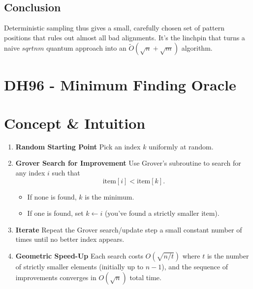 \documentclass[11pt]{article}
\begin{document}
\subsection*{Conclusion}
Deterministic sampling thus gives a small, carefully chosen set of pattern positions that rules out almost all bad alignments. It's the linchpin that turns a naive \(sqrt{nm}\) quantum approach into an \(\widetilde{O}(\sqrt{n} + \sqrt{m})\) algorithm.

\section*{DH96 - Minimum Finding Oracle}
\section*{Concept \& Intuition}
\begin{enumerate}
  \item \textbf{Random Starting Point}
        Pick an index \(k\) uniformly at random.
  \item \textbf{Grover Search for Improvement}
        Use Grover's subroutine to search for any index \(i\) such that
        \[
          \text{item}[i] < \text{item}[k].
        \]
        \begin{itemize}
          \item If none is found, \(k\) is the minimum.
          \item If one is found, set \(k \leftarrow i\) (you've found a strictly smaller item).
        \end{itemize}
  \item \textbf{Iterate}
        Repeat the Grover search/update step a small constant number of times until no better index appears.
  \item \textbf{Geometric Speed-Up}
        Each search costs \(O(\sqrt{n/t})\) where \(t\) is the number of strictly smaller elements (initially up to \(n-1\)), and the sequence of improvements converges in \(O(\sqrt{n})\) total time.
\end{enumerate}
\end{document}
